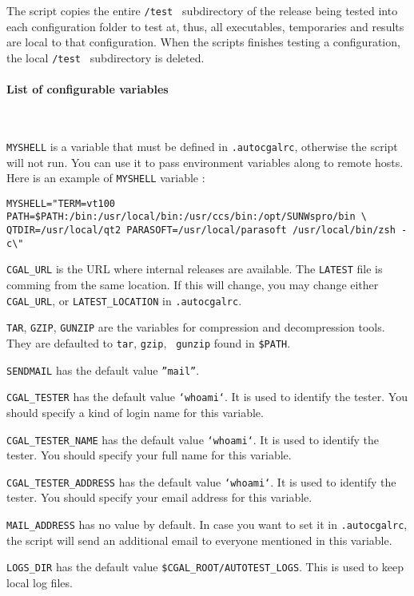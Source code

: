 The script copies the entire {\tt /test } subdirectory of the release being tested
into each configuration folder to test at, thus, all executables, temporaries
and results are local to that configuration. When the scripts finishes testing 
a configuration, the local {\tt /test } subdirectory is deleted.

\paragraph{List of configurable variables} ~

{\tt MYSHELL} is a variable that must be defined in {\tt .autocgalrc},
otherwise the script will not run.  You can use it to pass environment
variables along to remote hosts.  Here is an example of {\tt MYSHELL}
variable :
\begin{verbatim}
MYSHELL="TERM=vt100 PATH=$PATH:/bin:/usr/local/bin:/usr/ccs/bin:/opt/SUNWspro/bin \
QTDIR=/usr/local/qt2 PARASOFT=/usr/local/parasoft /usr/local/bin/zsh -c\"
\end{verbatim}

{\tt CGAL\_URL} is the URL where internal releases are available.
The {\tt LATEST} file is comming from the same location. If this will change,
you may change either {\tt CGAL\_URL}, or {\tt LATEST\_LOCATION}
in {\tt .autocgalrc}.

{\tt TAR}, {\tt GZIP}, {\tt GUNZIP} are the variables for compression and
decompression tools.  They are defaulted to {\tt tar}, {\tt gzip}, {\tt
gunzip} found in {\tt \$PATH}.

{\tt SENDMAIL} has the default value {\tt ''mail''}.

{\tt CGAL\_TESTER} has the default value {\tt `whoami`}.  It is used to
identify the tester.  You should specify a kind of login name for this
variable.

{\tt CGAL\_TESTER\_NAME} has the default value {\tt `whoami`}.  It is used to
identify the tester.  You should specify your full name for this variable.

{\tt CGAL\_TESTER\_ADDRESS} has the default value {\tt `whoami`}.  It is used
to identify the tester.  You should specify your email address for this
variable.

{\tt MAIL\_ADDRESS} has no value by default. In case you want to
set it in {\tt .autocgalrc}, the script will send an additional email to
everyone mentioned in this variable.

{\tt LOGS\_DIR} has the default value {\tt \$CGAL\_ROOT/AUTOTEST\_LOGS}.  This
is used to keep local log files.

